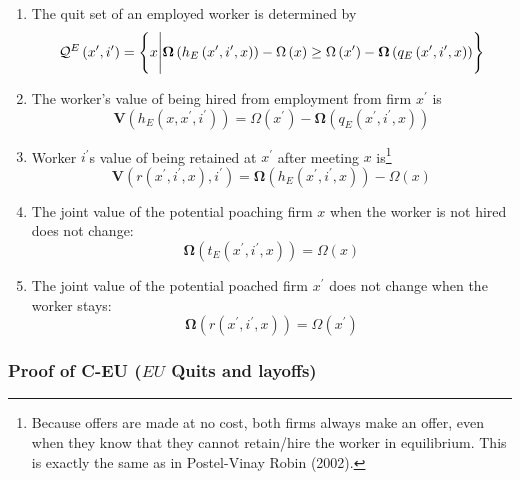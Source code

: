 \begin{enumerate}
\item The quit set of an employed worker is determined by
\begin{equation*}
\mathcal{Q}^{E}\left( x^{\prime },i^{\prime }\right) =\left\{ x\Bigg|\boldsymbol{%
\Omega }\left( h_{E}\left( x^{\prime },i^{\prime },x\right) \right) -\Omega
\left( x\right) \geq \Omega \left( x^{\prime }\right) -\boldsymbol{\Omega }%
\left( q_{E}\left( x^{\prime },i^{\prime },x\right) \right) \right\}
\end{equation*}

\item The worker's value of being hired from employment from firm $x^{\prime
}$ is
\begin{equation*}
\boldsymbol{V}(h_{E}(x,x^{\prime },i^{\prime }))=\Omega \left( x^{\prime
}\right) -\boldsymbol{\Omega }\left( q_{E}\left( x^{\prime },i^{\prime
},x\right) \right)
\end{equation*}

\item Worker $i^{\prime }$s value of being retained at $x^{\prime }$ after
meeting $x$ is\footnote{%
Because offers are made at no cost, both firms always make an offer, even
when they know that they cannot retain/hire the worker in equilibrium. This
is exactly the same as in Postel-Vinay Robin (2002).}
\begin{equation*}
\boldsymbol{V}(r(x^{\prime },i^{\prime },x),i^{\prime })=\boldsymbol{\Omega }\left(
h_{E}\left( x^{\prime },i^{\prime },x\right) \right) -\Omega \left( x\right)
\end{equation*}

\item The joint value of the potential poaching firm $x$ when the worker is
not hired does not change:
\begin{equation*}
\boldsymbol{\Omega}(t_E(x^{\prime},i^{\prime},x)) = \Omega(x)
\end{equation*}

\item The joint value of the potential poached firm $x^{\prime}$ does not
change when the worker stays:
\begin{equation*}
\boldsymbol{\Omega}(r(x^{\prime},i^{\prime},x)) = \Omega(x^{\prime})
\end{equation*}
\end{enumerate}

\subsubsection{Proof of C-EU ($EU$ Quits and layoffs)}

